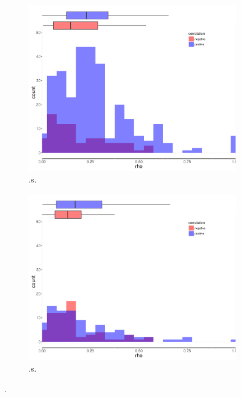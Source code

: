 \begin{figure}
\begin{subfigure}[b]{0.4\textwidth}
        \includegraphics[width = 1\textwidth]{figures/combinedplotWJ_ds.pdf}
        \caption{.s.}
        \label{fig:.}
    \end{subfigure}
\begin{subfigure}[b]{0.4\textwidth}
        \includegraphics[width = 1\textwidth]{figures/combinedplotWJ_ws.pdf}
        \caption{.s.}
        \label{fig:.}
    \end{subfigure}
\caption{.}
    \label{fig:.}
\end{figure}

